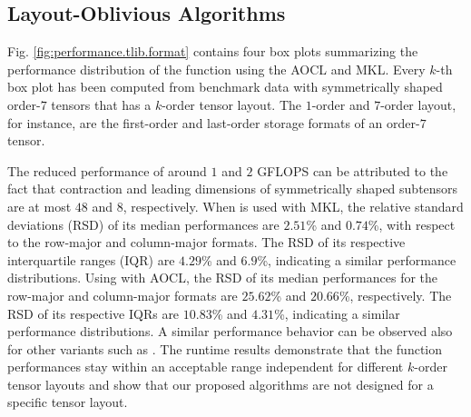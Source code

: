 

\subsection{Layout-Oblivious Algorithms}
Fig. \ref{fig:performance.tlib.format} contains four box plots summarizing the performance distribution of the  function using the AOCL and MKL.
Every $k$-th box plot has been computed from benchmark data with symmetrically shaped order-$7$ tensors that has a $k$-order tensor layout.
The $1$-order and $7$-order layout, for instance, are the first-order and last-order storage formats of an order-$7$ tensor.

The reduced performance of around $1$ and $2$ GFLOPS can be attributed to the fact that contraction and leading dimensions of symmetrically shaped subtensors are at most $48$ and $8$, respectively.
When  is used with MKL, the relative standard deviations (RSD) of its median performances are $2.51$\% and $0.74$\%, with respect to the row-major and column-major formats.
The RSD of its respective interquartile ranges (IQR) are $4.29$\% and $6.9$\%, indicating a similar performance distributions.
Using  with AOCL, the RSD of its median performances for the row-major and column-major formats are $25.62$\% and $20.66$\%, respectively.
The RSD of its respective IQRs are $10.83$\% and $4.31$\%, indicating a similar performance distributions.
A similar performance behavior can be observed also for other  variants such as .
The runtime results demonstrate that the function performances stay within an acceptable range independent for different $k$-order tensor layouts and show that our proposed algorithms are not designed for a specific tensor layout.




\begin{table*}[t]
	
	\caption%
	{%
		\footnotesize
		The table presents the minimum, median, and maximum runtime performances in GFLOPS/core alongside the median speedup of TLIB compared to other libraries.
		The tests were conducted on an Intel Xeon Gold 5318Y CPU (left) and an AMD EPYC 9354 CPU (right). 
		The performance values on the upper and lower rows of one table were evaluated using asymmetrically and symmetrically shaped tensors, respectively. 
	}
	\label{tab:comparison}
\end{table*}

